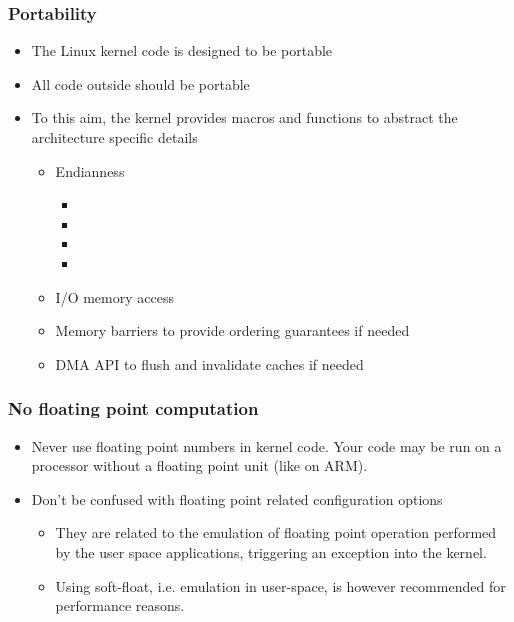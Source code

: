 \begin{frame}
  \frametitle{Portability}
  \begin{itemize}
  \item The Linux kernel code is designed to be portable
  \item All code outside  should be portable
  \item To this aim, the kernel provides macros and functions to
    abstract the architecture specific details
    \begin{itemize}
    \item Endianness
      \begin{itemize}
      \item {}
      \item {}
      \item {}
      \item {}
      \end{itemize}
    \item I/O memory access
    \item Memory barriers to provide ordering guarantees if needed
    \item DMA API to flush and invalidate caches if needed
    \end{itemize}
  \end{itemize}
\end{frame}

\begin{frame}
  \frametitle{No floating point computation}
  \begin{itemize}
  \item Never use floating point numbers in kernel code. Your code may
    be run on a processor without a floating point unit (like on ARM).
  \item Don't be confused with floating point related configuration
    options
    \begin{itemize}
    \item They are related to the emulation of floating point
      operation performed by the user space applications, triggering
      an exception into the kernel.
    \item Using soft-float, i.e. emulation in user-space, is however
      recommended for performance reasons.
    \end{itemize}
  \end{itemize}
\end{frame}

